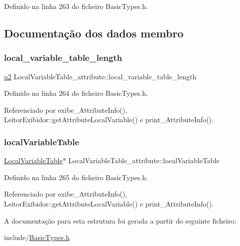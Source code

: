 Definido na linha 263 do ficheiro Basic\+Types.\+h.



\subsection{Documentação dos dados membro}
\mbox{\label{structLocalVariableTable__attribute_a64ee9d68a72f161a074d912bc0b8802f}} 
\subsubsection{\texorpdfstring{local\+\_\+variable\+\_\+table\+\_\+length}{local\_variable\_table\_length}}
{\footnotesize\ttfamily \hyperlink{BasicTypes_8h_a732cde1300aafb73b0ea6c2558a7a54f}{u2} Local\+Variable\+Table\+\_\+attribute\+::local\+\_\+variable\+\_\+table\+\_\+length}



Definido na linha 264 do ficheiro Basic\+Types.\+h.



Referenciado por exibe\+\_\+\+Attribute\+Info(), Leitor\+Exibidor\+::get\+Attribute\+Local\+Variable() e print\+\_\+\+Attribute\+Info().

\mbox{\label{structLocalVariableTable__attribute_aac0a6412785ab3e1be4ec14b381a4eba}} 
\subsubsection{\texorpdfstring{local\+Variable\+Table}{localVariableTable}}
{\footnotesize\ttfamily \hyperlink{structLocalVariableTable}{Local\+Variable\+Table}$\ast$ Local\+Variable\+Table\+\_\+attribute\+::local\+Variable\+Table}



Definido na linha 265 do ficheiro Basic\+Types.\+h.



Referenciado por exibe\+\_\+\+Attribute\+Info(), Leitor\+Exibidor\+::get\+Attribute\+Local\+Variable() e print\+\_\+\+Attribute\+Info().



A documentação para esta estrutura foi gerada a partir do seguinte ficheiro\+:\begin{DoxyCompactItemize}
\item 
include/\hyperlink{BasicTypes_8h}{Basic\+Types.\+h}\end{DoxyCompactItemize}
